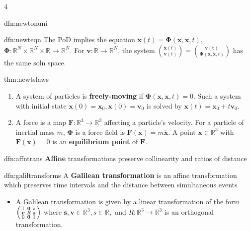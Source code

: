 \documentclass[landscape, 8pt]{extarticle}
\begin{document}
\begin{multicols*}{4}
\begin{dfn}{dfn:newtonuni}{ }
		\end{dfn}
		
		
		\begin{dfn}{dfn:newteqn}{ }
			The PoD implies the equation $\bm{\ddot{x}}(t) = \bm{\Phi}(\bm{x}, \bm{\dot{x}}, t)$, $\bm{\Phi}: \mathbb{R}^N \times \mathbb{R}^N \times \mathbb{R} \to \mathbb{R}^N$. For $\bm{v} : \mathbb{R} \to \mathbb{R}^N$, the system $\binom{\bm{\dot{x}}(t)}{\bm{v}(t)} = \binom{\bm{v(t)}}{\bm{\Phi}(\bm{x}, \bm{\dot{x}}, t)}$ has the same soln space.
			
		\end{dfn}
		
		
		\begin{mthm}{thm:newtslaws}{ }
			\begin{enumerate}[label=(\arabic*)]
				\item A system of particles is \textbf{freely-moving} if $\bm{\Phi}(\bm{x}, \bm{\dot{x}}, t) = 0$. Such a system with initial state $\bm{x}(0) = \bm{x}_0, \bm{\dot{x}}(0) = \bm{v}_0$ is solved by $\bm{x}(t) = \bm{x}_0 + t\bm{v}_0$.
				\item A force is a map $\bm{F} : \mathbb{R}^3 \to \mathbb{R}^3$ affecting a particle's velocity. For a particle of inertial mass $m$, $\bm{\Phi}$ is a force field is $\bm{F}(\bm{x}) = m \bm{\ddot{x}}$. A point $\bm{x}\in \mathbb{R}^3$ with $\bm{F}(\bm{x}) = 0$ is an \textbf{equilibrium point} of $\bm{F}$.
			\end{enumerate}
			
		\end{mthm}
		
		
		\begin{dfn}{dfn:affntrans}{ }
			\textbf{Affine} transformations preserve collinearity and ratios of distance
			
		\end{dfn}
		
		
		\begin{dfn}{dfn:galiltransforms}{ }
			A \textbf{Galilean transformation} is an affine transformation which preserves time intervals and the distance between simultaneous events
			\begin{itemize}
				\item A Galilean transformation is given by a linear transformation of the form $\begin{psmallmatrix*}
					1&\bm{0}&s\\
					\bm{v}&R&\bm{s}\\
					0&\bm{0}&1
				\end{psmallmatrix*}$ where $\bm{s, v}\in \mathbb{R}^3, s\in \mathbb{R},$ and $R: \mathbb{R}^3 \to \mathbb{R}^3$ is an orthogonal transformation.
			\end{itemize}
			

\end{dfn}
\end{multicols*}
\end{document}
